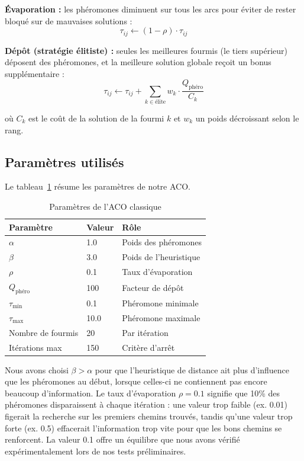 \documentclass[12pt, a4paper]{article}
\begin{document}
\textbf{Évaporation :} les phéromones diminuent sur tous les arcs pour éviter de rester bloqué sur de mauvaises solutions :
\begin{equation}
    \tau_{ij} \leftarrow (1 - \rho) \cdot \tau_{ij}
\end{equation}

\textbf{Dépôt (stratégie élitiste) :} seules les meilleures fourmis (le tiers supérieur) déposent des phéromones, et la meilleure solution globale reçoit un bonus supplémentaire :
\begin{equation}
    \tau_{ij} \leftarrow \tau_{ij} + \sum_{k \in \text{élite}} w_k \cdot \frac{Q_{\text{phéro}}}{C_k}
\end{equation}

où $C_k$ est le coût de la solution de la fourmi $k$ et $w_k$ un poids décroissant selon le rang.

\subsection{Paramètres utilisés}

Le tableau~\ref{tab:params_aco} résume les paramètres de notre ACO.

\begin{table}[H]
\centering
\caption{Paramètres de l'ACO classique}
\label{tab:params_aco}
\begin{tabular}{lll}
\toprule
\textbf{Paramètre} & \textbf{Valeur} & \textbf{Rôle} \\
\midrule
$\alpha$ & 1.0 & Poids des phéromones \\
$\beta$ & 3.0 & Poids de l'heuristique \\
$\rho$ & 0.1 & Taux d'évaporation \\
$Q_{\text{phéro}}$ & 100 & Facteur de dépôt \\
$\tau_{\min}$ & 0.1 & Phéromone minimale \\
$\tau_{\max}$ & 10.0 & Phéromone maximale \\
Nombre de fourmis & 20 & Par itération \\
Itérations max & 150 & Critère d'arrêt \\
\bottomrule
\end{tabular}
\end{table}

Nous avons choisi $\beta > \alpha$ pour que l'heuristique de distance ait plus d'influence que les phéromones au début, lorsque celles-ci ne contiennent pas encore beaucoup d'information. Le taux d'évaporation $\rho = 0.1$ signifie que 10\% des phéromones disparaissent à chaque itération : une valeur trop faible (ex. 0.01) figerait la recherche sur les premiers chemins trouvés, tandis qu'une valeur trop forte (ex. 0.5) effacerait l'information trop vite pour que les bons chemins se renforcent. La valeur 0.1 offre un équilibre que nous avons vérifié expérimentalement lors de nos tests préliminaires.
\end{document}
